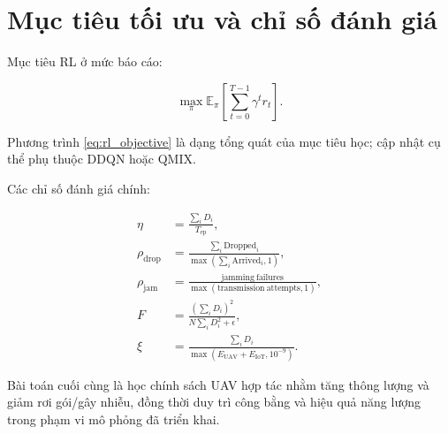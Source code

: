 \section{Mục tiêu tối ưu và chỉ số đánh giá}

Mục tiêu RL ở mức báo cáo:

\begin{equation}
\max_{\pi}\mathbb{E}_{\pi}\left[\sum_{t=0}^{T-1}\gamma^t r_t\right].
\label{eq:rl_objective}
\end{equation}

Phương trình \eqref{eq:rl_objective} là dạng tổng quát của mục tiêu học; cập nhật cụ thể phụ thuộc DDQN hoặc QMIX.

Các chỉ số đánh giá chính:

\begin{align}
\eta &= \frac{\sum_i D_i}{T_{\mathrm{ep}}}, \label{eq:throughput}\\
\rho_{\mathrm{drop}} &= \frac{\sum_i \mathrm{Dropped}_i}{\max(\sum_i \mathrm{Arrived}_i,1)}, \label{eq:drop_rate}\\
\rho_{\mathrm{jam}} &= \frac{\mathrm{jamming\ failures}}{\max(\mathrm{transmission\ attempts},1)}, \label{eq:jam_rate}\\
F &= \frac{(\sum_i D_i)^2}{N\sum_iD_i^2+\epsilon}, \label{eq:jain}\\
\xi &= \frac{\sum_iD_i}{\max(E_{\mathrm{UAV}}+E_{\mathrm{IoT}},10^{-9})}. \label{eq:energy_efficiency}
\end{align}

Bài toán cuối cùng là học chính sách UAV hợp tác nhằm tăng thông lượng và giảm rơi gói/gây nhiễu, đồng thời duy trì công bằng và hiệu quả năng lượng trong phạm vi mô phỏng đã triển khai.
